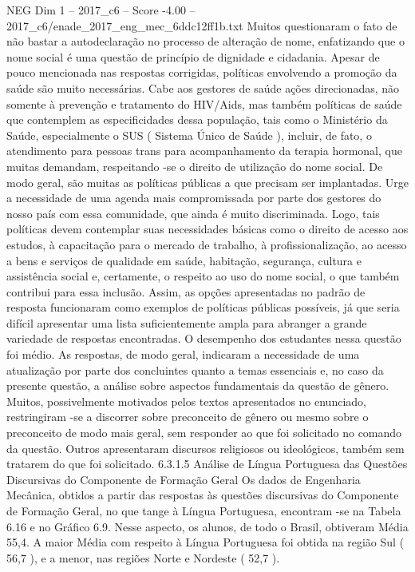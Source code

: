 \begin{textsample}{NEG Dim 1 – 2017\_c6 – Score -4.00 – 2017\_c6/enade\_2017\_eng\_mec\_6ddc12ff1b.txt}
Muitos questionaram o fato de não bastar a autodeclaração no processo de alteração de nome, enfatizando que o nome social é uma questão de princípio de dignidade e cidadania.
Apesar de pouco mencionada nas respostas corrigidas, políticas envolvendo a promoção da saúde são muito necessárias.
Cabe aos gestores de saúde ações direcionadas, não somente à prevenção e tratamento do HIV/Aids, mas também políticas de saúde que contemplem as especificidades dessa população, tais como o Ministério da Saúde, especialmente o SUS ( Sistema Único de Saúde ), incluir, de fato, o atendimento para pessoas trans para acompanhamento da terapia hormonal, que muitas demandam, respeitando -se o direito de utilização do nome social.
De modo geral, são muitas as políticas públicas a que precisam ser implantadas.
Urge a necessidade de uma agenda mais compromissada por parte dos gestores do nosso país com essa comunidade, que ainda é muito discriminada.
Logo, tais políticas devem contemplar suas necessidades básicas como o direito de acesso aos estudos, à capacitação para o mercado de trabalho, à profissionalização, ao acesso a bens e serviços de qualidade em saúde, habitação, segurança, cultura e assistência social e, certamente, o respeito ao uso do nome social, o que também contribui para essa inclusão.
Assim, as opções apresentadas no padrão de resposta funcionaram como exemplos de políticas públicas possíveis, já que seria difícil apresentar uma lista suficientemente ampla para abranger a grande variedade de respostas encontradas.
O desempenho dos estudantes nessa questão foi médio.
As respostas, de modo geral, indicaram a necessidade de uma atualização por parte dos concluintes quanto a temas essenciais e, no caso da presente questão, a análise sobre aspectos fundamentais da questão de gênero.
Muitos, possivelmente motivados pelos textos apresentados no enunciado, restringiram -se a discorrer sobre preconceito de gênero ou mesmo sobre o preconceito de modo mais geral, sem responder ao que foi solicitado no comando da questão.
Outros apresentaram discursos religiosos ou ideológicos, também sem tratarem do que foi solicitado. 6.3.1.5 Análise de Língua Portuguesa das Questões Discursivas do Componente de Formação Geral Os dados de Engenharia Mecânica, obtidos a partir das respostas às questões discursivas do Componente de Formação Geral, no que tange à Língua Portuguesa, encontram -se na Tabela 6.16 e no Gráfico 6.9.
Nesse aspecto, os alunos, de todo o Brasil, obtiveram Média 55,4.
A maior Média com respeito à Língua Portuguesa foi obtida na região Sul ( 56,7 ), e a menor, nas regiões Norte e Nordeste ( 52,7 ).

\end{textsample}
